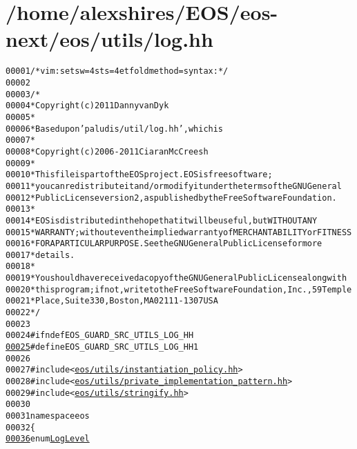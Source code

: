 \hypertarget{log_8hh_source}{
\section{/home/alexshires/EOS/eos-\/next/eos/utils/log.hh}
}


\begin{footnotesize}\begin{alltt}
00001 \textcolor{comment}{/* vim: set sw=4 sts=4 et foldmethod=syntax : */}
00002 
00003 \textcolor{comment}{/*}
00004 \textcolor{comment}{ * Copyright (c) 2011 Danny van Dyk}
00005 \textcolor{comment}{ *}
00006 \textcolor{comment}{ * Based upon 'paludis/util/log.hh', which is}
00007 \textcolor{comment}{ *}
00008 \textcolor{comment}{ *   Copyright (c) 2006-2011 Ciaran McCreesh}
00009 \textcolor{comment}{ *}
00010 \textcolor{comment}{ * This file is part of the EOS project. EOS is free software;}
00011 \textcolor{comment}{ * you can redistribute it and/or modify it under the terms of the GNU General}
00012 \textcolor{comment}{ * Public License version 2, as published by the Free Software Foundation.}
00013 \textcolor{comment}{ *}
00014 \textcolor{comment}{ * EOS is distributed in the hope that it will be useful, but WITHOUT ANY}
00015 \textcolor{comment}{ * WARRANTY; without even the implied warranty of MERCHANTABILITY or FITNESS}
00016 \textcolor{comment}{ * FOR A PARTICULAR PURPOSE.  See the GNU General Public License for more}
00017 \textcolor{comment}{ * details.}
00018 \textcolor{comment}{ *}
00019 \textcolor{comment}{ * You should have received a copy of the GNU General Public License along with}
00020 \textcolor{comment}{ * this program; if not, write to the Free Software Foundation, Inc., 59 Temple}
00021 \textcolor{comment}{ * Place, Suite 330, Boston, MA  02111-1307  USA}
00022 \textcolor{comment}{ */}
00023 
00024 \textcolor{preprocessor}{#ifndef EOS\_GUARD\_SRC\_UTILS\_LOG\_HH}
\hypertarget{log_8hh_source_l00025}{}\hyperlink{log_8hh_a911a0223120f9d69b5ba0a5782c3a7a2}{00025} \textcolor{preprocessor}{}\textcolor{preprocessor}{#define EOS\_GUARD\_SRC\_UTILS\_LOG\_HH 1}
00026 \textcolor{preprocessor}{}
00027 \textcolor{preprocessor}{#include <\hyperlink{instantiation__policy_8hh}{eos/utils/instantiation_policy.hh}>}
00028 \textcolor{preprocessor}{#include <\hyperlink{private__implementation__pattern_8hh}{eos/utils/private_implementation_pattern.hh}>}
00029 \textcolor{preprocessor}{#include <\hyperlink{stringify_8hh}{eos/utils/stringify.hh}>}
00030 
00031 \textcolor{keyword}{namespace }eos
00032 \{
\hypertarget{log_8hh_source_l00036}{}\hyperlink{namespaceeos_ad6b42a08a08a1b63498f3f262bd15602}{00036}     \textcolor{keyword}{enum} \hyperlink{namespaceeos_ad6b42a08a08a1b63498f3f262bd15602}{LogLevel}

\end{alltt}
\end{footnotesize}
